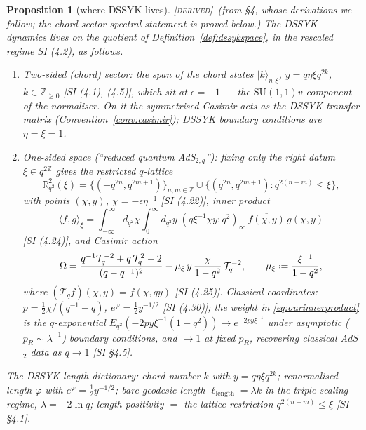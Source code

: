 \documentclass[11pt,a4paper]{article}
\providecommand{\coloneqq}{\mathrel{\vcenter{\baselineskip0.5ex \lineskiplimit0pt
      \hbox{\scriptsize.}\hbox{\scriptsize.}}}=}
\newcommand{\DERIVED}{{\color{teal}\textsc{[derived]}}}
\theoremstyle{definition}
\theoremstyle{plain}
\newtheorem{proposition}[definition]{Proposition}
\newcommand{\Cas}{\Omega}                       %
\newcommand{\Z}{\mathbb{Z}}
\newcommand{\R}{\mathbb{R}}
\newcommand{\ket}[1]{|#1\rangle}
\begin{document}
\begin{proposition}[where DSSYK lives]\label{prop:where}
\DERIVED\ (from \cite{Schouten:2025dssyk} \S4, whose derivations we follow; the chord-sector
spectral statement is proved below.) The DSSYK dynamics lives on the quotient of
Definition~\ref{def:dssykspace}, in the rescaled regime SI (4.2), as follows.
\begin{enumerate}[label=(\alph*)]
\item \emph{Two-sided (chord) sector:} the span of the chord states
$\ket{k}_{\eta,\xi}$, $y=q\eta\xi q^{2k}$, $k\in\Z_{\ge0}$ [SI (4.1), (4.5)], which sit at
$\epsilon=-1$ --- the $\mathrm{SU}(1,1)v$ component of the normaliser. On it the symmetrised
Casimir acts as the DSSYK transfer matrix (Convention~\ref{conv:casimir}); DSSYK boundary
conditions are $\eta=\xi=1$.
\item \emph{One-sided space (``reduced quantum AdS$_{2,q}$''):} fixing only the right datum
$\xi\in q^{2\Z}$ gives the restricted $q$-lattice
\begin{equation}\label{eq:ourlattice}
  \R^{2}_{q^{2}}(\xi)=\{(-q^{2n},q^{2m+1})\}_{n,m\in\Z}\cup
  \{(q^{2n},q^{2m+1}):q^{2(n+m)}\le\xi\},
\end{equation}
with points $(\chi,y)$, $\chi=-\epsilon\eta^{-1}$ [SI (4.22)], inner product
\begin{equation}\label{eq:ourinnerproduct}
  \langle f,g\rangle_{\xi}
  =\int_{-\infty}^{\infty}\!\!d_{q^{2}}\chi\int_{0}^{\infty}\!\!d_{q^{2}}y\;
  (q\xi^{-1}\chi y;q^{2})_{\infty}\,\overline{f(\chi,y)}\,g(\chi,y)
\end{equation}
[SI (4.24)], and Casimir action
\begin{equation}\label{eq:ourradialoperator}
  \Cas=\frac{q^{-1}\mathcal{T}_{q}^{-2}+q\,\mathcal{T}_{q}^{2}-2}{(q-q^{-1})^{2}}
  -\mu_{\xi}\,y\,\frac{\chi}{1-q^{2}}\,\mathcal{T}_{q}^{-2},
  \qquad \mu_{\xi}\coloneqq\frac{\xi^{-1}}{1-q^{2}},
\end{equation}
where $(\mathcal{T}_{q}f)(\chi,y)=f(\chi,qy)$ [SI (4.25)]. Classical coordinates:
$p=\tfrac12\chi/(q^{-1}-q)$, $e^{\varphi}=\tfrac12 y^{-1/2}$ [SI (4.30)]; the weight in
\eqref{eq:ourinnerproduct} is the $q$-exponential
$E_{q^{2}}(-2py\xi^{-1}(1-q^{2}))\to e^{-2py\xi^{-1}}$ under asymptotic ($p_{R}\sim\lambda^{-1}$)
boundary conditions, and $\to1$ at fixed $p_R$, recovering classical AdS$_2$ data as $q\to1$
[SI \S4.5].
\end{enumerate}
The DSSYK length dictionary: chord number $k$ with $y=q\eta\xi q^{2k}$; renormalised length
$\varphi$ with $e^{\varphi}=\tfrac12y^{-1/2}$; bare geodesic length $\ell_{\mathrm{length}}
=\lambda k$ in the triple-scaling regime, $\lambda=-2\ln q$; length positivity $=$ the lattice
restriction $q^{2(n+m)}\le\xi$ [SI \S4.1].
\end{proposition}
\end{document}
